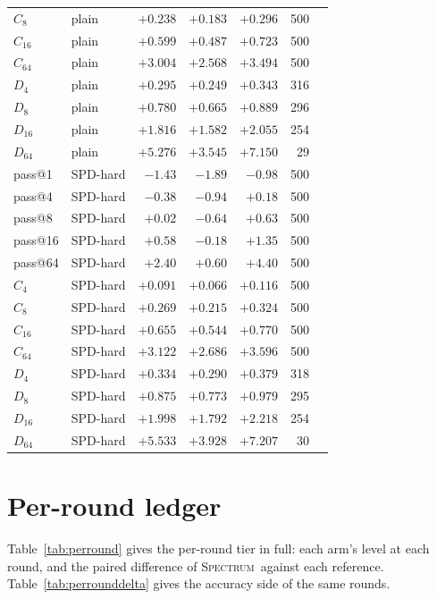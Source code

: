 \documentclass{article}
\newcommand{\method}{\textsc{Spectrum}}
\begin{document}
\begin{table}[h]
\begin{tabular}{llrrrrr}
$C_{8}$  & plain & $+0.238$ & $+0.183$ & $+0.296$ & 500 \\
$C_{16}$ & plain & $+0.599$ & $+0.487$ & $+0.723$ & 500 \\
$C_{64}$ & plain & $+3.004$ & $+2.568$ & $+3.494$ & 500 \\
$D_{4}$  & plain & $+0.295$ & $+0.249$ & $+0.343$ & 316 \\
$D_{8}$  & plain & $+0.780$ & $+0.665$ & $+0.889$ & 296 \\
$D_{16}$ & plain & $+1.816$ & $+1.582$ & $+2.055$ & 254 \\
$D_{64}$ & plain & $+5.276$ & $+3.545$ & $+7.150$ & 29 \\
\midrule
pass@1   & SPD-hard & $-1.43$ & $-1.89$ & $-0.98$ & 500 \\
pass@4   & SPD-hard & $-0.38$ & $-0.94$ & $+0.18$ & 500 \\
pass@8   & SPD-hard & $+0.02$ & $-0.64$ & $+0.63$ & 500 \\
pass@16  & SPD-hard & $+0.58$ & $-0.18$ & $+1.35$ & 500 \\
pass@64  & SPD-hard & $+2.40$ & $+0.60$ & $+4.40$ & 500 \\
$C_{4}$  & SPD-hard & $+0.091$ & $+0.066$ & $+0.116$ & 500 \\
$C_{8}$  & SPD-hard & $+0.269$ & $+0.215$ & $+0.324$ & 500 \\
$C_{16}$ & SPD-hard & $+0.655$ & $+0.544$ & $+0.770$ & 500 \\
$C_{64}$ & SPD-hard & $+3.122$ & $+2.686$ & $+3.596$ & 500 \\
$D_{4}$  & SPD-hard & $+0.334$ & $+0.290$ & $+0.379$ & 318 \\
$D_{8}$  & SPD-hard & $+0.875$ & $+0.773$ & $+0.979$ & 295 \\
$D_{16}$ & SPD-hard & $+1.998$ & $+1.792$ & $+2.218$ & 254 \\
$D_{64}$ & SPD-hard & $+5.533$ & $+3.928$ & $+7.207$ & 30 \\
\bottomrule
\end{tabular}
\end{table}

\section{Per-round ledger}
\label{app:perround}

Table~\ref{tab:perround} gives the per-round tier in full: each arm's level at each round, and the paired difference of \method\ against each reference. Table~\ref{tab:perrounddelta} gives the accuracy side of the same rounds.
\end{document}
